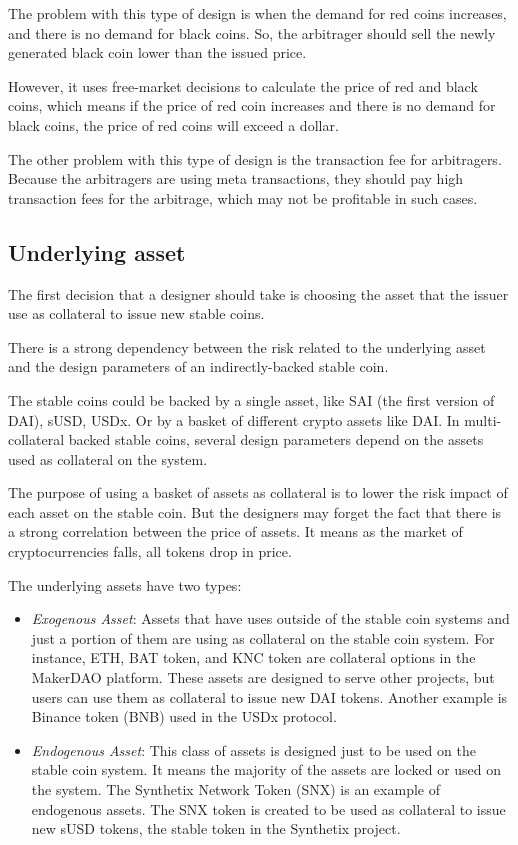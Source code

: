 The problem with this type of design is when the demand for red coins increases, and there is no demand for black coins. So, the arbitrager should sell the newly generated black coin lower than the issued price.

However, it uses free-market decisions to calculate the price of red and black coins, which means if the price of red coin increases and there is no demand for black coins, the price of red coins will exceed a dollar. 

The other problem with this type of design is the transaction fee for arbitragers. Because the arbitragers are using meta transactions, they should pay high transaction fees for the arbitrage, which may not be profitable in such cases.
\subsection{Underlying asset}
The first decision that a designer should take is choosing the asset that the issuer use as collateral to issue new stable coins.

There is a strong dependency between the risk related to the underlying asset and the design parameters of an indirectly-backed stable coin.

The stable coins could be backed by a single asset, like SAI (the first version of DAI), sUSD, USDx. Or by a basket of different crypto assets like DAI. In multi-collateral backed stable coins, several design parameters depend on the assets used as collateral on the system. 

The purpose of using a basket of assets as collateral is to lower the risk impact of each asset on the stable coin. But the designers may forget the fact that there is a strong correlation between the price of assets. It means as the market of cryptocurrencies falls, all tokens drop in price. 

The underlying assets have two types:

\begin{itemize}
	\item \emph{Exogenous Asset}: Assets that have uses outside of the stable coin systems and just a portion of them are using as collateral on the stable coin system. For instance, ETH, BAT token, and KNC token are collateral options in the MakerDAO platform. These assets are designed to serve other projects, but users can use them as collateral to issue new DAI tokens.
	Another example is Binance token (BNB) used in the USDx protocol. 
	\item \emph{Endogenous Asset}: This class of assets is designed just to be used on the stable coin system. It means the majority of the assets are locked or used on the system. The Synthetix Network Token (SNX) is an example of endogenous assets. The SNX token is created to be used as collateral to issue new sUSD tokens, the stable token in the Synthetix project.
\end{itemize}



